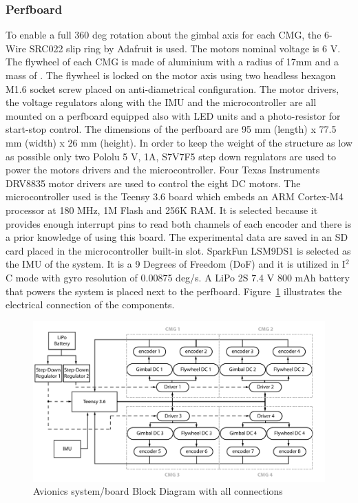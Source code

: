 \documentclass[aerospace,article,submit,moreauthors,dvi2pdf]{Definitions/mdpi}
\begin{document}
\subsubsection{Perfboard}
To enable a full 360 deg rotation about the gimbal axis for each CMG, the 6-Wire SRC022 slip ring by Adafruit is used. The motors nominal voltage is 6 V.
The flywheel of each CMG is made of aluminium with a radius of 17mm and a mass of . The flywheel is locked on the motor axis using two headless hexagon M1.6 socket screw placed on anti-diametrical configuration. 
The motor drivers, the voltage regulators along with the IMU and the microcontroller are all mounted on a perfboard equipped also with LED units and a photo-resistor for start-stop control. The dimensions of the perfboard are 95 mm (length) x 77.5 mm (width) x 26 mm (height). In order to keep the weight of the structure as low as possible only two Pololu 5 V, 1A, S7V7F5 step down regulators are used to power the motors drivers and the microcontroller. 
Four Texas Instruments DRV8835 motor drivers are used to control the eight DC motors. The microcontroller used is the Teensy 3.6 board which embeds an ARM Cortex-M4 processor at 180 MHz, 1M Flash and 256K RAM. It is selected because it provides enough interrupt pins to read both channels of each encoder and there is a prior knowledge of using this board. The experimental data are saved in an SD card placed in the microcontroller built-in slot. SparkFun LSM9DS1 is selected as the IMU of the system. It is a 9 Degrees of Freedom (DoF) and it is utilized in I$^2$C mode with gyro resolution of 0.00875 deg/s. A LiPo 2S 7.4 V 800 mAh battery that powers the system is placed next to the perfboard. 
Figure~\ref{fig:conn} illustrates the electrical connection of the components. 
\begin{figure}[H]
\includegraphics[width=13cm]{connections.pdf}
\caption{Avionics system/board Block Diagram with all connections \label{fig:conn}}
\end{figure}
\end{document}
